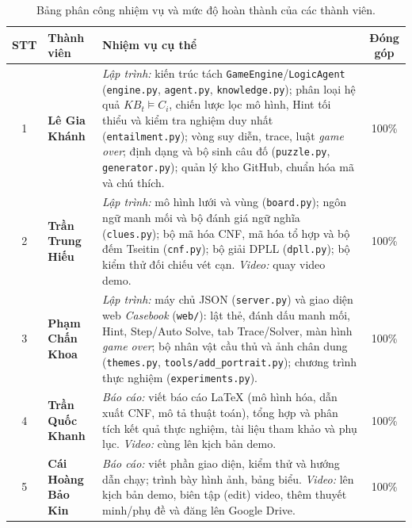 \documentclass{article}
\newcommand{\code}[1]{\texttt{#1}}
\newcommand{\KB}{\mathit{KB}}
\begin{document}
\begin{table}[H]
\centering
\small
\renewcommand{\arraystretch}{1.3}
\begin{tabularx}{\textwidth}{|c|l|>{\raggedright\arraybackslash}X|c|}
\hline
\rowcolor{gray!20}
\textbf{STT} & \textbf{Thành viên} & \textbf{Nhiệm vụ cụ thể} & \textbf{Đóng góp} \\
\hline
1 & \textbf{Lê Gia Khánh} & \textit{Lập trình:} kiến trúc tách \code{GameEngine}/\code{LogicAgent} (\code{engine.py}, \code{agent.py}, \code{knowledge.py}); phân loại hệ quả $\KB_t \models C_i$, chiến lược lọc mô hình, Hint tối thiểu và kiểm tra nghiệm duy nhất (\code{entailment.py}); vòng suy diễn, trace, luật \textit{game over}; định dạng và bộ sinh câu đố (\code{puzzle.py}, \code{generator.py}); quản lý kho GitHub, chuẩn hóa mã và chú thích. & 100\% \\
\hline
2 & \textbf{Trần Trung Hiếu} & \textit{Lập trình:} mô hình lưới và vùng (\code{board.py}); ngôn ngữ manh mối và bộ đánh giá ngữ nghĩa (\code{clues.py}); bộ mã hóa CNF, mã hóa tổ hợp và bộ đếm Tseitin (\code{cnf.py}); bộ giải DPLL (\code{dpll.py}); bộ kiểm thử đối chiếu vét cạn. \textit{Video:} quay video demo. & 100\% \\
\hline
3 & \textbf{Phạm Chấn Khoa} & \textit{Lập trình:} máy chủ JSON (\code{server.py}) và giao diện web \textit{Casebook} (\code{web/}): lật thẻ, đánh dấu manh mối, Hint, Step/Auto Solve, tab Trace/Solver, màn hình \textit{game over}; bộ nhân vật cầu thủ và ảnh chân dung (\code{themes.py}, \code{tools/add\_portrait.py}); chương trình thực nghiệm (\code{experiments.py}). & 100\% \\
\hline
4 & \textbf{Trần Quốc Khanh} & \textit{Báo cáo:} viết báo cáo LaTeX (mô hình hóa, dẫn xuất CNF, mô tả thuật toán), tổng hợp và phân tích kết quả thực nghiệm, tài liệu tham khảo và phụ lục. \textit{Video:} cùng lên kịch bản demo. & 100\% \\
\hline
5 & \textbf{Cái Hoàng Bảo Kin} & \textit{Báo cáo:} viết phần giao diện, kiểm thử và hướng dẫn chạy; trình bày hình ảnh, bảng biểu. \textit{Video:} lên kịch bản demo, biên tập (edit) video, thêm thuyết minh/phụ đề và đăng lên Google Drive. & 100\% \\
\hline
\end{tabularx}
\caption{Bảng phân công nhiệm vụ và mức độ hoàn thành của các thành viên.}
\label{tab:phan_cong_cong_viec}
\end{table}

\end{document}

